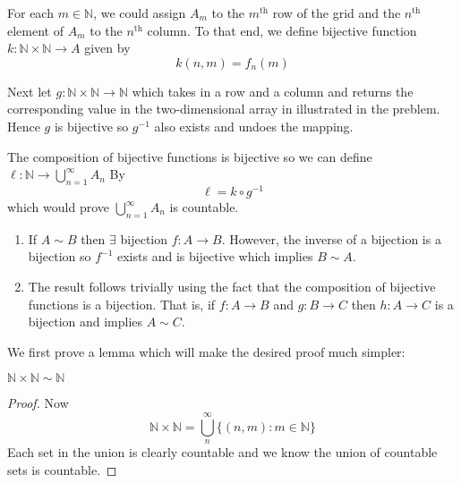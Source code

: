 \begin{enumerate}[label=(\alph*)]
   For each $m\in \mathbb{N}$, we could assign $A_m$ to the $m^{\text{th}}$ row
   of the grid and the $n^{\text{th}}$ element of $A_m$ to the $n^{\text{th}}$ 
   column. To that end, we define bijective function $k : \mathbb{N} \times \mathbb{N} \rightarrow A$ given by
   \begin{equation*}
        k(n,m) = f_n(m)
   \end{equation*}

   Next let $g: \mathbb{N} \times \mathbb{N} \rightarrow \mathbb{N}$ which 
   takes in a row and a column and returns the corresponding value in the 
   two-dimensional array in illustrated in the preblem. Hence $g$ is bijective 
   so $g^{-1}$ also exists and undoes the mapping.
   
   The composition of bijective functions is bijective so we can define
   $\ell : \mathbb{N} \rightarrow \bigcup_{n=1}^\infty A_n$ By
   \begin{equation*}
        \ell = k \circ g^{-1}
   \end{equation*}
   which would prove $\bigcup_{n=1}^\infty A_n$ is countable.
    
\end{enumerate}

\begin{enumerate}[label=(\alph*)]
    \item 
    If $A \sim B$ then $\exists$ bijection $f: A\rightarrow B$. However, 
    the inverse of a bijection is a bijection so $f^{-1}$ exists and is bijective
    which implies $B\sim A$.

    \item
    The result follows trivially using the fact that the composition of 
    bijective functions is a bijection. That is, if $f:A \rightarrow B$ and 
    $g:B \rightarrow C$ then $h:A\rightarrow C$ is a bijection and implies $A \sim C$.
\end{enumerate}

We first prove a lemma which will make the desired proof much simpler:
\begin{lemma}
    $\mathbb{N} \times \mathbb{N} \sim \mathbb{N}$
\end{lemma}
\begin{proof}
    Now
    \begin{equation*}
        \mathbb{N} \times \mathbb{N} = \bigcup_{n}^\infty \{ (n,m) : m \in \mathbb{N} \}
    \end{equation*}
    Each set in the union is clearly countable and we know the union of countable sets is countable.
\end{proof}

